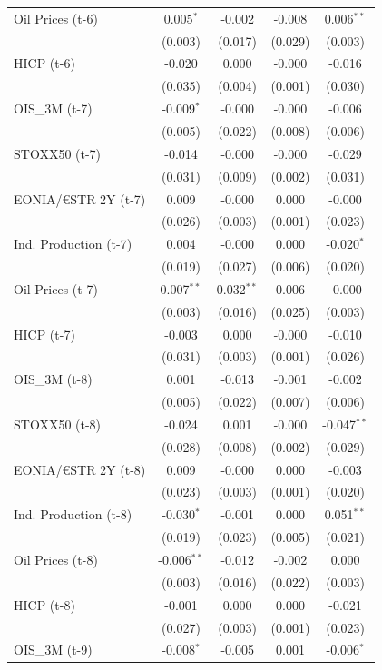 \begin{longtable}[t]{lcccc}
Oil Prices (t-6) & 0.005$^{*}$ & -0.002 & -0.008 & 0.006$^{**}$\\
 & (0.003) & (0.017) & (0.029) & (0.003)\\
HICP (t-6) & -0.020 & 0.000 & -0.000 & -0.016\\
 & (0.035) & (0.004) & (0.001) & (0.030)\\
OIS\_3M (t-7) & -0.009$^{*}$ & -0.000 & -0.000 & -0.006\\
 & (0.005) & (0.022) & (0.008) & (0.006)\\
STOXX50 (t-7) & -0.014 & -0.000 & -0.000 & -0.029\\
 & (0.031) & (0.009) & (0.002) & (0.031)\\
EONIA/€STR 2Y (t-7) & 0.009 & -0.000 & 0.000 & -0.000\\
 & (0.026) & (0.003) & (0.001) & (0.023)\\
Ind. Production (t-7) & 0.004 & -0.000 & 0.000 & -0.020$^{*}$\\
 & (0.019) & (0.027) & (0.006) & (0.020)\\
Oil Prices (t-7) & 0.007$^{**}$ & 0.032$^{**}$ & 0.006 & -0.000\\
 & (0.003) & (0.016) & (0.025) & (0.003)\\
HICP (t-7) & -0.003 & 0.000 & -0.000 & -0.010\\
 & (0.031) & (0.003) & (0.001) & (0.026)\\
OIS\_3M (t-8) & 0.001 & -0.013 & -0.001 & -0.002\\
 & (0.005) & (0.022) & (0.007) & (0.006)\\
STOXX50 (t-8) & -0.024 & 0.001 & -0.000 & -0.047$^{**}$\\
 & (0.028) & (0.008) & (0.002) & (0.029)\\
EONIA/€STR 2Y (t-8) & 0.009 & -0.000 & 0.000 & -0.003\\
 & (0.023) & (0.003) & (0.001) & (0.020)\\
Ind. Production (t-8) & -0.030$^{*}$ & -0.001 & 0.000 & 0.051$^{**}$\\
 & (0.019) & (0.023) & (0.005) & (0.021)\\
Oil Prices (t-8) & -0.006$^{**}$ & -0.012 & -0.002 & 0.000\\
 & (0.003) & (0.016) & (0.022) & (0.003)\\
HICP (t-8) & -0.001 & 0.000 & 0.000 & -0.021\\
 & (0.027) & (0.003) & (0.001) & (0.023)\\
OIS\_3M (t-9) & -0.008$^{*}$ & -0.005 & 0.001 & -0.006$^{*}$\\

\end{longtable}
